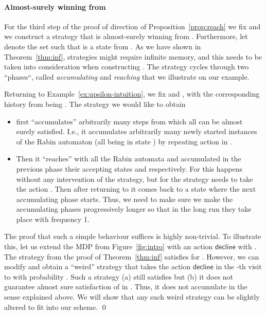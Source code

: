 \documentclass[a4paper,UKenglish]{lipics}
\newcommand{\ap}[1]{\ensuremath{\mathsf{#1}}}
\begin{document}
\paragraph*{Almost-surely winning from }

For the third step of the proof of direction  of Proposition~\ref{prop:reach} we fix  and we construct a strategy  that is almost-surely winning from . Furthermore, let  denote the set such that  is a state from . 
As we have shown in Theorem~\ref{thm:inf}, strategies might require infinite memory, and this needs to be taken into
consideration when constructing . The strategy cycles through two ``phases``, called {\em accumulating} and {\em reaching} that we illustrate on our example.

\begin{example}\label{ex:accum-intuition} 
	Returning to Example~\ref{ex:upsilon-intuition}, 
	we fix  and , with the corresponding history from  being . The strategy  we would like to obtain
	\begin{itemize} 
		\item first ``accumulates'' arbitrarily many steps from which all  can be almost surely satisfied. I.e., it accumulates arbitrarily many newly started instances of the Rabin automaton  (all being in state ) by repeating action  in .
		\item Then it ``reaches'' with all the Rabin automata  and  accumulated in the previous phase their accepting states  and  respectively. For  this happens without any intervention of the strategy,
		but for  the strategy needs to take the action . Then after returning to  it comes back to a state where the next accumulating
		phase starts.
Thus, we need to make sure we make the accumulating phases progressively longer so that in the long run they take place with frequency 1.
	\end{itemize}
	The proof that such a simple behaviour suffices is highly non-trivial.
To illustrate this, let us extend the MDP from Figure~\ref{fig:intro} with an action \ap{decline} with .
	The strategy  from the proof of Theorem~\ref{thm:inf} satisfies  for .
However, we can modify  and obtain a ``weird'' strategy  that takes the action \ap{decline} in the -th visit to  with probability . Such a strategy (a) still satisfies  but (b) it does not guarantee almost sure satisfaction of  in . Thus, it does not accumulate in the sense explained above. We will show that any such weird strategy can be slightly altered to fit into our scheme. \qed
\end{example}
\end{document}
